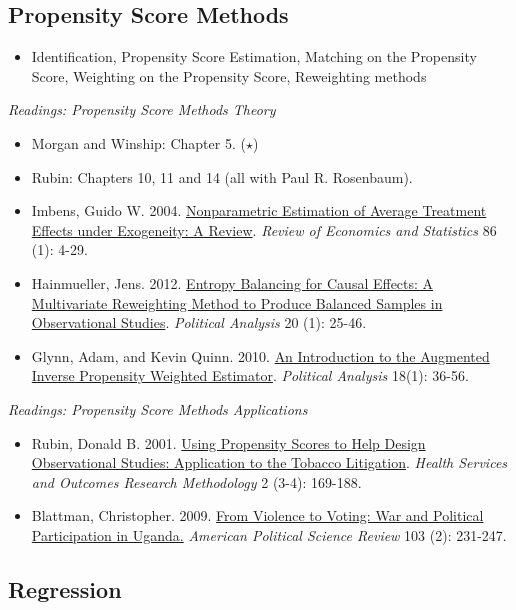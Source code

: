 \documentclass{article}
\begin{document}
\subsection{Propensity Score Methods}

\begin{itemize}
\item Identification, Propensity Score Estimation, Matching on the Propensity Score, Weighting on the Propensity Score, Reweighting methods
\end{itemize}

\emph{Readings: Propensity Score Methods Theory}
\begin{itemize}
\item Morgan and Winship: Chapter 5. ($\star$)
\item Rubin: Chapters 10, 11 and 14 (all with Paul
  R. Rosenbaum).
\item Imbens, Guido W. 2004.
  \href{http://www.mitpressjournals.org/doi/abs/10.1162/003465304323023651}{Nonparametric
    Estimation of Average Treatment Effects under Exogeneity: A
    Review}. \textit{Review of Economics and Statistics} 86 (1): 4-29.
\item Hainmueller,
  Jens. 2012. \href{http://pan.oxfordjournals.org/content/20/1/25.abstract}{Entropy
    Balancing for Causal Effects: A Multivariate Reweighting Method to
    Produce Balanced Samples in Observational
    Studies}. \textit{Political Analysis} 20 (1): 25-46.
\item Glynn, Adam, and Kevin Quinn. 2010. \href{http://pan.oxfordjournals.org/content/18/1/36}{An Introduction to the Augmented Inverse Propensity Weighted Estimator}. \textit{Political Analysis} 18(1): 36-56.
\end{itemize}

\emph{Readings: Propensity Score Methods Applications}
\begin{itemize}
\item Rubin, Donald B. 2001.  \href{http://www.springerlink.com/index/R445GG1778314228.pdf}{Using Propensity Scores to Help Design Observational Studies: Application
to the Tobacco Litigation}. \textit{Health Services and Outcomes Research Methodology} 2 (3-4): 169-188.
\item Blattman, Christopher. 2009. \href{http://www.journals.cambridge.org/abstract_S0003055409090212}{From Violence to Voting: War and Political Participation in Uganda.} \textit{American Political Science Review} 103 (2): 231-247.
\end{itemize}
\subsection{Regression}
\end{document}
